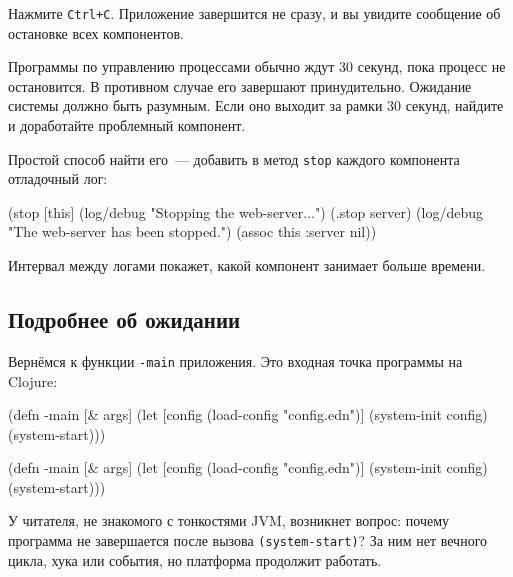 Нажмите \verb|Ctrl+C|. Приложение завершится не сразу, и вы увидите сообщение
об остановке всех компонентов.

Программы по управлению процессами обычно ждут 30 секунд, пока процесс не
остановится. В противном случае его завершают принудительно. Ожидание системы
должно быть разумным. Если оно выходит за рамки 30 секунд, найдите и доработайте
проблемный компонент.

Простой способ найти его~--- добавить в метод \verb|stop| каждого компонента
отладочный лог:

\begin{english}
  \begin{clojure}
(stop [this]
  (log/debug "Stopping the web-server...")
  (.stop server)
  (log/debug "The web-server has been stopped.")
  (assoc this :server nil))
  \end{clojure}
\end{english}

Интервал между логами покажет, какой компонент занимает больше времени.

\subsection{Подробнее об ожидании}


Вернёмся к функции \verb|-main| приложения. Это входная точка программы на
Clojure:

\ifnarrow

\begin{english}
  \begin{clojure}
(defn -main [& args]
  (let [config
        (load-config "config.edn")]
    (system-init config)
    (system-start)))
  \end{clojure}
\end{english}

\else

\begin{english}
  \begin{clojure}
(defn -main [& args]
  (let [config (load-config "config.edn")]
    (system-init config)
    (system-start)))
  \end{clojure}
\end{english}

\fi

У читателя, не знакомого с тонкостями JVM, возникнет вопрос: почему программа не
завершается после вызова \verb|(system-start)|? За ним нет вечного цикла, хука
или события, но платформа продолжит работать.


